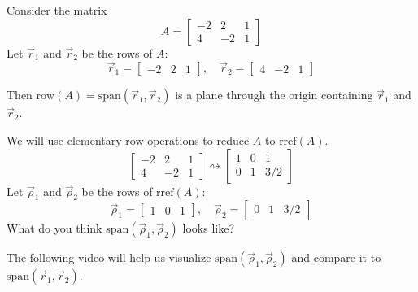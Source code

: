 \documentclass{ximera}
\begin{document}
\begin{exploration}\label{init:rowspace}
Consider the matrix
$$A=\begin{bmatrix}-2&2&1\\4&-2&1\end{bmatrix}$$
Let $\vec{r}_1$ and $\vec{r}_2$ be the rows of $A$: 
$$\vec{r}_1=\begin{bmatrix}-2&2&1\end{bmatrix},\quad \vec{r}_2=\begin{bmatrix}4&-2&1\end{bmatrix}$$

Then 
$\mbox{row}(A)=\mbox{span}(\vec{r}_1, \vec{r}_2)$
is a plane through the origin containing $\vec{r}_1$ and  $\vec{r}_2$.  

\begin{image}
\end{image}

We will use elementary row operations to reduce $A$ to $\mbox{rref}(A)$.
$$\begin{bmatrix}-2&2&1\\4&-2&1\end{bmatrix}\rightsquigarrow\begin{bmatrix}1&0&1\\0&1&3/2\end{bmatrix}$$
Let $\vec{\rho}_1$ and $\vec{\rho}_2$ be the rows of $\mbox{rref}(A)$:
$$\vec{\rho}_1=\begin{bmatrix}1&0&1\end{bmatrix},\quad \vec{\rho}_2=\begin{bmatrix}0&1&3/2\end{bmatrix}$$
What do you think $\mbox{span}(\vec{\rho}_1, \vec{\rho}_2)$ looks like?  

The following video will help us visualize $\mbox{span}(\vec{\rho}_1, \vec{\rho}_2)$ and compare it to $\mbox{span}(\vec{r}_1, \vec{r}_2)$.


\end{exploration}
\end{document}
